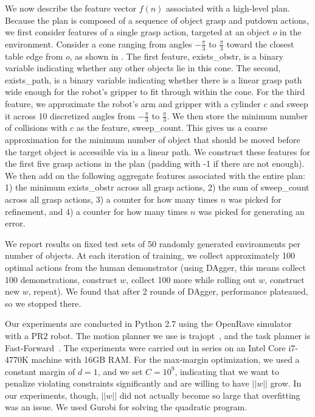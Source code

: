 We now describe the feature vector $f(n)$ associated with a high-level plan. Because the plan is composed
of a sequence of object grasp and putdown actions, we first consider features of a single grasp action, targeted
at an object $o$ in the environment. Consider a cone ranging from angles $-\frac{\pi}{3}$ to $\frac{\pi}{3}$
toward the closest table edge from $o$, as shown in . The first feature, exists\_obstr, is a binary variable indicating
whether any other objects lie in this cone. The second, exists\_path, is a binary variable indicating whether there is a linear
grasp path wide enough for the robot's gripper to fit through within the cone. For the third feature, we approximate the robot's arm and gripper with a cylinder $c$ and sweep it across 10 discretized angles from $-\frac{\pi}{3}$ to
$\frac{\pi}{3}$. We then store the minimum number of collisions with $c$ as the feature, sweep\_count. This gives us a coarse approximation for the minimum number of object that should be moved before the target object is accessible via in a linear path.
We construct these features for the first five grasp actions in the plan (padding with -1 if there are not enough).
We then add on the following aggregate features associated with the entire plan: 1) the minimum exists\_obstr across all grasp actions,
2) the sum of sweep\_count across all grasp actions, 3) a counter for how many times $n$ was picked for refinement, and
4) a counter for how many times $n$ was picked for generating an error.

We report results on fixed test sets of 50 randomly generated environments per number of objects. At each
iteration of training, we collect approximately 100 optimal actions from the human demonstrator (using
DAgger, this means collect 100 demonstrations, construct $w$, collect 100 more while rolling out $w$, construct new $w$, repeat).
We found that after 2 rounds of DAgger, performance plateaued, so we stopped there.

Our experiments are conducted in Python 2.7 using the OpenRave simulator~\cite{Diankov_2008_6117} with a PR2 robot.
The motion planner we use is trajopt~\cite{schulman2013finding}, and the task planner is Fast-Forward~\cite{FF}.
The experiments were carried out in series on an Intel Core i7-4770K machine with 16GB RAM. For the max-margin optimization,
we used a constant margin of $d = 1$, and we set $C = 10^{9}$, indicating that we want to penalize violating
constraints significantly and are willing to have $||w||$ grow. In our experiments, though, $||w||$ did not actually become
so large that overfitting was an issue. We used Gurobi for solving the quadratic program.

